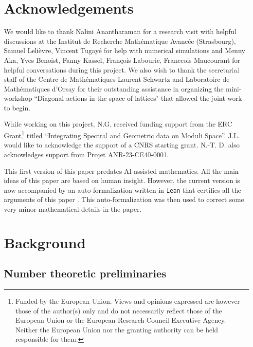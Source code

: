 \documentclass[11pt,letterpaper]{amsart}
\theoremstyle{definition}
\theoremstyle{remark}
\newcommand{\nihar}{\color{red}}
\renewcommand{\c}{c}
\begin{document}
   
   

   
    	
	
	\section*{Acknowledgements}
	
	We would like to thank 
	Nalini Anantharaman for a research visit with helpful discussions at the 
	Institut de Recherche Mathématique Avancée (Strasbourg), Samuel Lelièvre, Vincent Tugayé for help with numerical simulations and Menny Aka, Yves Benoist, Fanny Kassel, François Labourie, Fran\c{c}ois Maucourant for helpful conversations during this project. {We also wish to thank the secretarial staff of the Centre de Math\'ematiques Laurent Schwartz and Laboratoire de Math\'ematiques d'Orsay for their outstanding assistance in organizing the mini-workshop ``Diagonal actions in the space of lattices" that allowed the joint work to begin.} %
	
	While working on this project, N.G. received funding support from the ERC Grant\footnote{
Funded by the European Union. Views and opinions expressed are however those of the author(s) only and do not necessarily reflect those of the European Union or the European Research Council Executive Agency. Neither the European Union nor the granting authority can be held responsible for them.
}
	titled ``Integrating Spectral and Geometric data on Moduli Space''. J.L. would like to acknowledge the support of a CNRS starting grant.
	N.-T. D. also acknowledges support from Projet ANR-23-CE40-0001.
	
	This first version of this paper predates AI-assisted mathematics. All the main ideas of this paper are based on human insight. However, the current version is now accompanied by an auto-formalization written in \texttt{Lean} that certifies all the arguments of this paper \cite{gargava_density_of_shapes}. This auto-formalization was then used to correct some very minor mathematical details in the paper.
	
	\section{Background}
	
	\subsection{Number theoretic preliminaries}
	\label{ss:nt_prelims}
	
\end{document}
